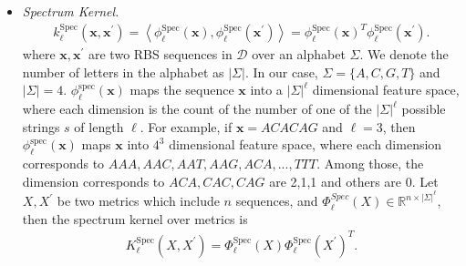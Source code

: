 \begin{itemize}
    \item \textit{Spectrum Kernel.}
    \begin{align}
        k_\ell^{\text{Spec}}(\mathbf{x}, \mathbf{x}^\prime) =\left\langle\phi_{\ell}^{\mathrm{Spec}}(\mathbf{x}), \phi_{\ell}^{\mathrm{Spec}}\left(\mathbf{x}^{\prime}\right)\right\rangle = \phi_{\ell}^{\mathrm{Spec}}(\mathbf{x})^T \phi_{\ell}^{\mathrm{Spec}}\left(\mathbf{x}^{\prime}\right).
    \end{align}
     where $\mathbf{x}, \mathbf{x}^\prime$ are two RBS sequences in $\mathcal{D}$ over an alphabet $\Sigma$. We denote the number of letters in the alphabet as $|\Sigma|$. 
     In our case, $\Sigma = \{A,C,G,T\}$ and $|\Sigma| = 4$.
    $\phi_{\ell}^{\mathrm{spec}}(\mathbf{x})$ maps the sequence $\mathbf{x}$ into a $|\Sigma|^\ell$ dimensional feature space, where each dimension is the count of the number of one of the $|\Sigma|^\ell$ possible strings $s$ of length $\ell$. 
    For example, if $\mathbf{x} = ACACAG$ and $\ell = 3$, then $\phi_{\ell}^{\mathrm{spec}}(\mathbf{x})$ maps $\mathbf{x}$ into $4^3$ dimensional feature space, where each dimension corresponds to $AAA, AAC, AAT, AAG, ACA, ..., TTT$. Among those, the dimension corresponds to $ACA, CAC, CAG$ are 2,1,1 and others are 0. 
    Let $X, X^\prime$ be two metrics which include $n$ sequences, and $\Phi_\ell^{Spec}(X) \in \mathbb{R}^{n \times |\Sigma|^{\ell}}$, then the spectrum kernel over metrics is 
    \begin{align}
         K_\ell^{\text{Spec}}(X, X^\prime) = \Phi_{\ell}^{\mathrm{Spec}}(X) \Phi_{\ell}^{\mathrm{Spec}}\left(X^{\prime}\right)^T.
    \end{align}
    
    

\end{itemize}
